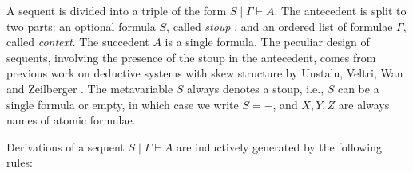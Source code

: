 \documentclass[submission,copyright,creativecommons]{eptcs}
\theoremstyle{definition}
\begin{document}
A sequent is divided into a triple of the form $S \mid \Gamma \vdash A$.
The antecedent is split to two parts: an optional formula $S$, called \emph{stoup} \cite{girard:constructive:91}, and an ordered list of formulae $\Gamma$, called \emph{context}.
The succedent $A$ is a single formula.
The peculiar design of sequents, involving the presence of the stoup in the antecedent, comes from previous work on deductive systems with skew structure by Uustalu, Veltri, Wan and Zeilberger \cite{uustalu:sequent:2021,uustalu:proof:nodate,uustalu:deductive:nodate,veltri:coherence:2021,UVW:protsn}.
The metavariable $S$ always denotes a stoup, i.e., $S$ can be a single formula or empty, in which case we write $S = {-}$, and $X,Y,Z$ are always names of atomic formulae.

Derivations of a sequent $S \mid \Gamma \vdash A$ are inductively generated by the following rules:
\end{document}
